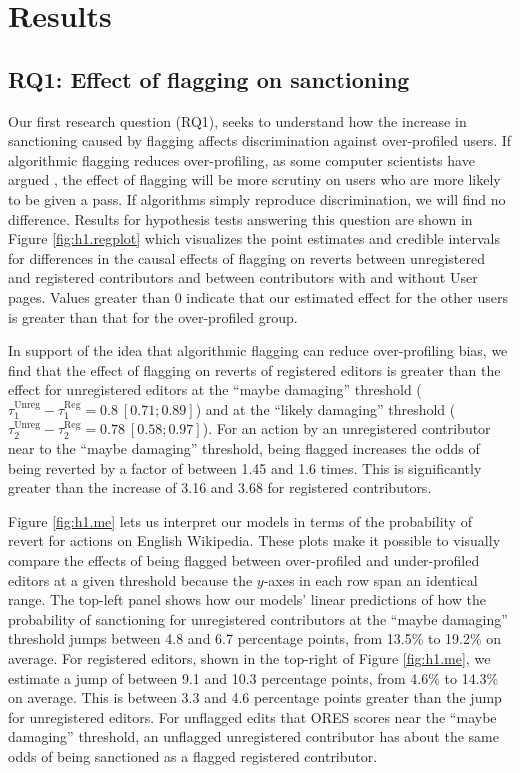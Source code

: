 \documentclass[format=acmsmall, natbib=true,  screen=true]{acmart}
\begin{document}
\section{Results}
\subsection{RQ1: Effect of flagging on sanctioning}
\label{sec:results-rq1}




Our first research question (RQ1), seeks to understand how the increase in sanctioning caused by flagging 
affects discrimination against over-profiled users. If algorithmic flagging reduces over-profiling, as some computer scientists have argued \citep{kleinberg_human_2018}, the effect of flagging will be more scrutiny on users who are more likely to be given a pass. If algorithms simply reproduce discrimination, we will find no difference.
Results for hypothesis tests answering this question are shown in Figure \ref{fig:h1.regplot} which visualizes the point estimates and credible intervals for differences in the causal effects of flagging on reverts between unregistered and registered contributors and between contributors with and without User pages. Values greater than 0 indicate that our estimated effect for the other users is greater than that for the over-profiled group. 


In support of the idea that algorithmic flagging can reduce over-profiling bias, we find that the effect of flagging on reverts of registered editors is greater than the effect for unregistered editors at the ``maybe damaging'' threshold ($\tau^{\mathrm{Unreg}}_1 - \tau^{\mathrm{Reg}}_1 = 0.8~[0.71;\allowbreak 0.89]$) and at the ``likely damaging'' threshold ($\tau^{\mathrm{Unreg}}_2 - \tau^{\mathrm{Reg}}_2 = 0.78~[0.58;\allowbreak 0.97]$).
For an action by an unregistered contributor near to the ``maybe damaging'' threshold, being flagged increases the odds of being reverted by a factor of between 1.45 and 1.6 times. This is significantly greater than the increase of
3.16 and 3.68 
 for registered contributors. 

Figure \ref{fig:h1.me} lets us interpret our models in terms of the probability of revert for actions on English Wikipedia.  These plots make it possible to visually compare the effects of being flagged between over-profiled and under-profiled editors at a given threshold because the $y$-axes in each row span an identical range. The top-left panel shows how our models' linear predictions of how the probability of sanctioning for unregistered contributors  at the ``maybe damaging'' threshold jumps between 4.8 and 6.7
percentage points, from 13.5\% to 19.2\% on average. For registered editors, shown in the top-right of Figure \ref{fig:h1.me}, we estimate a jump of between 9.1 and 10.3 percentage points, from  4.6\% to 14.3\% on average. This is between
 3.3 and 4.6 percentage points greater than the jump for unregistered editors.
For unflagged edits that ORES scores near the ``maybe damaging'' threshold, an unflagged unregistered contributor has about the same odds of being sanctioned as a flagged registered contributor.   
\end{document}
